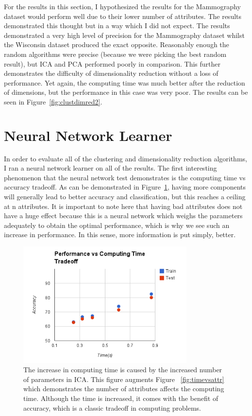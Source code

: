 \documentclass[annual]{acmsiggraph}
\begin{document}
For the results in this section, I hypothesized the results for the Mammography dataset would perform well due to their lower number of attributes. The results demonstrated this thought but in a way which I did not expect. The results demonstrated a very high level of precision for the Mammography dataset whilst the Wisconsin dataset produced the exact opposite. Reasonably enough the random algorithms were precise (because we were picking the best random result), but ICA and PCA performed poorly in comparison. This further demonstrates the difficulty of dimensionality reduction without a loss of performance. Yet again, the computing time was much better after the reduction of dimensions, but the performance in this case was very poor. The results can be seen in Figure~\ref{fig:clustdimred2}.

\section{Neural Network Learner}
In order to evaluate all of the clustering and dimensionality reduction algorithms, I ran a neural network learner on all of the results. The first interesting phenomenon that the neural network test demonstrates is the computing time vs accuracy tradeoff. As can be demonstrated in Figure~\ref{fig:perftime}, having more components will generally lead to better accuracy and classification, but this reaches a ceiling at n attributes. It is important to note here that having bad attributes does not have a huge effect because this is a neural network which weighs the parameters adequately to obtain the optimal performance, which is why we see such an increase in performance. In this sense, more information is put simply, better.
\begin{figure}[ht]
  \centering
  \includegraphics[width=3.5in]{charts/accuracy_time_tradeoff.png}
  \caption{The increase in computing time is caused by the increased number of parameters in ICA. This figure augments Figure ~\ref{fig:timevsattr} which demonstrates the number of attributes affects the computing time. Although the time is increased, it comes with the benefit of accuracy, which is a classic tradeoff in computing problems.}
  \label{fig:perftime}
\end{figure}
\end{document}
